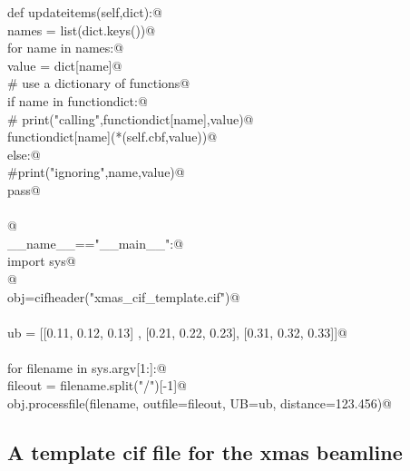 \documentclass[10pt,a4paper,twoside,notitlepage]{article}
\begin{document}
\begin{flushleft}
\begin{minipage}{\linewidth}
\begin{list}{}{}
\mbox{}\verb@    def updateitems(self,dict):@\\
\mbox{}\verb@        names = list(dict.keys())@\\
\mbox{}\verb@        for name in names:@\\
\mbox{}\verb@            value = dict[name]@\\
\mbox{}\verb@            # use a dictionary of functions@\\
\mbox{}\verb@            if name in functiondict:@\\
\mbox{}\verb@                # print("calling",functiondict[name],value)@\\
\mbox{}\verb@                functiondict[name](*(self.cbf,value))@\\
\mbox{}\verb@            else:@\\
\mbox{}\verb@                #print("ignoring",name,value)@\\
\mbox{}\verb@                pass@\\
\mbox{}\verb@@\\
\mbox{}\verb@        @\\
\mbox{}\verb@if __name__=="__main__":@\\
\mbox{}\verb@    import sys@\\
\mbox{}\verb@    @\\
\mbox{}\verb@    obj=cifheader("xmas_cif_template.cif")@\\
\mbox{}\verb@@\\
\mbox{}\verb@    ub = [[0.11, 0.12, 0.13] , [0.21, 0.22, 0.23], [0.31, 0.32, 0.33]]@\\
\mbox{}\verb@@\\
\mbox{}\verb@    for filename in sys.argv[1:]:@\\
\mbox{}\verb@        fileout = filename.split("/")[-1]@\\
\mbox{}\verb@        obj.processfile(filename, outfile=fileout, UB=ub, distance=123.456)@\\
\mbox{}\verb@@{\NWsep}
\end{list}
\vspace{-1.5ex}
\footnotesize
\begin{list}{}{\setlength{\itemsep}{-\parsep}\setlength{\itemindent}{-\leftmargin}}

\item{}
\end{list}
\end{minipage}\vspace{4ex}
\end{flushleft}
\subsection{A template cif file for the xmas beamline}
\end{document}
